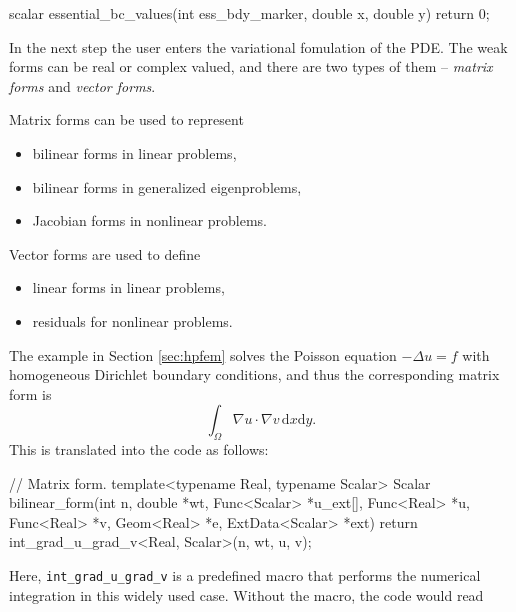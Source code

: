 \documentclass[final,3p,times,twocolumn]{elsarticle}
\begin{document}
\begin{code}
scalar essential_bc_values(int ess_bdy_marker, 
                           double x, double y)
{
  return 0;
}
\end{code}
In the next step the user enters the variational fomulation
of the PDE. The weak forms can be real or complex valued,
and there are two types of them -- {\em matrix forms} and
{\em vector forms}. 

Matrix forms can be used to represent 
\begin{itemize}
\item bilinear forms in linear problems, 
\item bilinear forms in generalized eigenproblems,
\item Jacobian forms in nonlinear problems.
\end{itemize}
Vector forms are used to define

\begin{itemize}
\item linear forms in linear problems,
\item residuals for nonlinear problems.
\end{itemize}
The example in Section \ref{sec:hpfem} 
solves the Poisson equation $-\Delta u = f$
with homogeneous Dirichlet boundary conditions,
and thus the corresponding matrix form is 
$$
\int_{\Omega} \nabla u \cdot \nabla v \, \mbox{d}x\mbox{d}y.
$$
This is translated into the code as follows:

\begin{code}
// Matrix form.
template<typename Real, typename Scalar>
Scalar bilinear_form(int n, double *wt, 
                     Func<Scalar> *u_ext[], 
                     Func<Real> *u, Func<Real> *v, 
                     Geom<Real> *e, 
                     ExtData<Scalar> *ext)
{
  return int_grad_u_grad_v<Real, Scalar>(n, wt, u, v);
}
\end{code}
Here, {\tt int\_grad\_u\_grad\_v} is a predefined macro 
that performs the numerical integration in this widely used
case. Without the macro, the code would read
\end{document}
